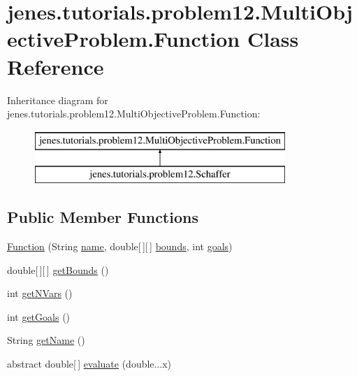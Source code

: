 \hypertarget{classjenes_1_1tutorials_1_1problem12_1_1_multi_objective_problem_1_1_function}{\section{jenes.\-tutorials.\-problem12.\-Multi\-Objective\-Problem.\-Function Class Reference}
\label{classjenes_1_1tutorials_1_1problem12_1_1_multi_objective_problem_1_1_function}
}
Inheritance diagram for jenes.\-tutorials.\-problem12.\-Multi\-Objective\-Problem.\-Function\-:\begin{figure}[H]
\begin{center}
\leavevmode
\includegraphics[height=2.000000cm]{classjenes_1_1tutorials_1_1problem12_1_1_multi_objective_problem_1_1_function}
\end{center}
\end{figure}
\subsection*{Public Member Functions}
\begin{DoxyCompactItemize}
\item 
\hyperlink{classjenes_1_1tutorials_1_1problem12_1_1_multi_objective_problem_1_1_function_a5e899dccd1eea2ccf39548a50ca59431}{Function} (String \hyperlink{classjenes_1_1tutorials_1_1problem12_1_1_multi_objective_problem_1_1_function_aa6ba25bb3bdfd596b9acf04e242dd8b9}{name}, double\mbox{[}$\,$\mbox{]}\mbox{[}$\,$\mbox{]} \hyperlink{classjenes_1_1tutorials_1_1problem12_1_1_multi_objective_problem_1_1_function_a967f81c2f3f08aaf45ea8a9cea350a6a}{bounds}, int \hyperlink{classjenes_1_1tutorials_1_1problem12_1_1_multi_objective_problem_1_1_function_a0407f39b5b8f36b8db33a72d46561cf8}{goals})
\item 
double\mbox{[}$\,$\mbox{]}\mbox{[}$\,$\mbox{]} \hyperlink{classjenes_1_1tutorials_1_1problem12_1_1_multi_objective_problem_1_1_function_aef721e01e829eb4f3143fff29a75d907}{get\-Bounds} ()
\item 
int \hyperlink{classjenes_1_1tutorials_1_1problem12_1_1_multi_objective_problem_1_1_function_a38c6645519375ddd4c68c00210db7d87}{get\-N\-Vars} ()
\item 
int \hyperlink{classjenes_1_1tutorials_1_1problem12_1_1_multi_objective_problem_1_1_function_ae1d5dd671e6620ee122f7c0d59af183b}{get\-Goals} ()
\item 
String \hyperlink{classjenes_1_1tutorials_1_1problem12_1_1_multi_objective_problem_1_1_function_ae4f2e9d8407fc204574b1a8a517e5269}{get\-Name} ()
\item 
abstract double\mbox{[}$\,$\mbox{]} \hyperlink{classjenes_1_1tutorials_1_1problem12_1_1_multi_objective_problem_1_1_function_a12fde3b63d0edeff7539d4463041c2bd}{evaluate} (double...\-x)
\end{DoxyCompactItemize}

